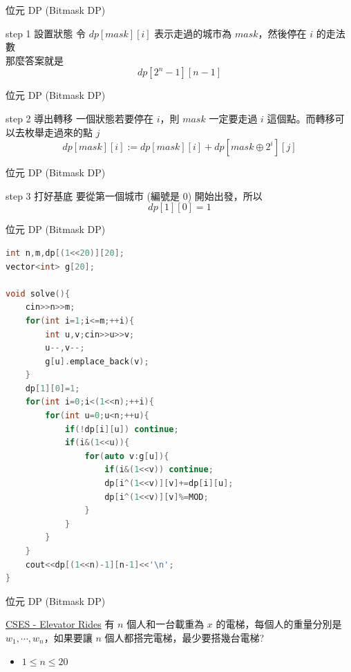 \documentclass[aspectratio=169]{beamer}
\begin{document}
    \begin{frame}{位元 DP (Bitmask DP)}
        \begin{alertblock}{step 1 設置狀態}
            令 $dp[mask][i]$ 表示走過的城市為 $mask$，然後停在 $i$ 的走法數\\
            那麼答案就是 $$dp[2^n-1][n-1]$$
        \end{alertblock}
    \end{frame}

    \begin{frame}{位元 DP (Bitmask DP)}
        \begin{block}{step 2 導出轉移}
            一個狀態若要停在 $i$，則 $mask$ 一定要走過 $i$ 這個點。而轉移可以去枚舉走過來的點 $j$
            $$dp[mask][i] := dp[mask][i] + dp[mask \oplus 2^i][j]$$
        \end{block}
    \end{frame}
    
     \begin{frame}{位元 DP (Bitmask DP)}
        \begin{block}{step 3 打好基底}
            要從第一個城市 (編號是 $0$) 開始出發，所以
            $$dp[1][0] = 1$$
        \end{block}
    \end{frame}
    
    \begin{frame}[fragile]{位元 DP (Bitmask DP)}
        \begin{lstlisting}[language=C++, basicstyle=\ttfamily\tiny]
int n,m,dp[(1<<20)][20];
vector<int> g[20];
 
void solve(){
    cin>>n>>m;
    for(int i=1;i<=m;++i){
        int u,v;cin>>u>>v;
        u--,v--;
        g[u].emplace_back(v);
    }
    dp[1][0]=1;
    for(int i=0;i<(1<<n);++i){
        for(int u=0;u<n;++u){
            if(!dp[i][u]) continue;
            if(i&(1<<u)){
                for(auto v:g[u]){
                    if(i&(1<<v)) continue;
                    dp[i^(1<<v)][v]+=dp[i][u];
                    dp[i^(1<<v)][v]%=MOD;
                }
            }
        }
    }
    cout<<dp[(1<<n)-1][n-1]<<'\n';
}
        \end{lstlisting}
    \end{frame}
    
    \begin{frame}{位元 DP (Bitmask DP)}
        \begin{block}{\href{https://cses.fi/problemset/task/1653}{CSES - Elevator Rides}}
            有 $n$ 個人和一台載重為 $x$ 的電梯，每個人的重量分別是 $w_1, \cdots, w_n$，如果要讓 $n$ 個人都搭完電梯，最少要搭幾台電梯?
            \begin{itemize}
                \item $1 \leq n \leq 20 $
            \end{itemize}
        \end{block}
    \end{frame}
    
\end{document}
